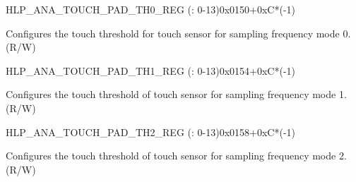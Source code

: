 \begin{register}{H}{LP\_ANA\_TOUCH\_PAD\_TH0\_REG (: 0-13)}{0x0150+0xC*(-1)}\label{regdesc:LPANATOUCHPAD0TH0REG}
%
%
\regnewline%
\begin{regdesc}\begin{reglist}
\label{fielddesc:LPANATOUCHPAD0TH0}\item [LP\_ANA\_TOUCH\_PAD\regindex{n}\_TH0] Configures the touch threshold for touch sensor  for sampling frequency mode 0. (R/W)
\end{reglist}\end{regdesc}
\end{register}


\begin{register}{H}{LP\_ANA\_TOUCH\_PAD\_TH1\_REG (: 0-13)}{0x0154+0xC*(-1)}\label{regdesc:LPANATOUCHPAD0TH1REG}
%
%
\regnewline%
\begin{regdesc}\begin{reglist}
\label{fielddesc:LPANATOUCHPAD0TH1}\item [LP\_ANA\_TOUCH\_PAD\regindex{n}\_TH1]  Configures the touch threshold of touch sensor  for sampling frequency mode 1. (R/W)
\end{reglist}\end{regdesc}
\end{register}


\begin{register}{H}{LP\_ANA\_TOUCH\_PAD\_TH2\_REG (: 0-13)}{0x0158+0xC*(-1)}\label{regdesc:LPANATOUCHPAD0TH2REG}
%
%
\regnewline%
\begin{regdesc}\begin{reglist}
\label{fielddesc:LPANATOUCHPAD0TH2}\item [LP\_ANA\_TOUCH\_PAD\regindex{n}\_TH2] Configures the touch threshold of touch sensor  for sampling frequency mode 2. (R/W)
\end{reglist}\end{regdesc}
\end{register}


